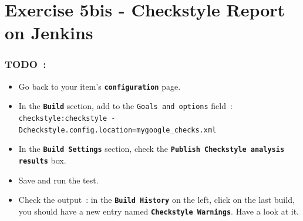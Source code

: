 \documentclass{article}
\begin{document}
\section{Exercise 5bis - Checkstyle Report on Jenkins}

\subsubsection{TODO~:}
\begin{itemize}
\item Go back to your item's \textbf{\texttt{configuration}} page.
\item In the \textbf{\texttt{Build}} section, add to the \texttt{Goals and options} field~:\\
\texttt{checkstyle:checkstyle -Dcheckstyle.config.location=mygoogle\_checks.xml}
\item In the \textbf{\texttt{Build Settings}} section, check the \textbf{\texttt{Publish Checkstyle analysis results}} box.
\item Save and run the test.
\item Check the output~: in the \textbf{\texttt{Build History}} on the left, click on the last build, you should have a new entry named \textbf{\texttt{Checkstyle Warnings}}. Have a look at it.
\end{itemize}

\clearpage
\end{document}
